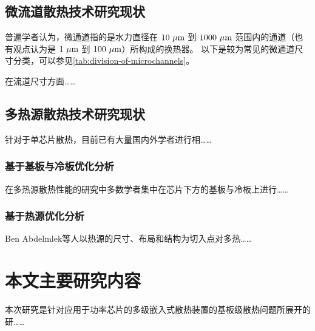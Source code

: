 \subsection{微流道散热技术研究现状}
普遍学者认为，微通道指的是水力直径在 $10\ \rm{\mu m}$ 到 $1000\ \rm{\mu m}$ 范围内的通道（也有观点认为是 $1\ \rm{\mu m}$ 到 $100\ \rm{\mu m}$）所构成的换热器。
以下是较为常见的微通道尺寸分类，可以参见\cref{tab:division-of-microchannels}。
\begin{table}[htbp]
    \caption[微通道的划分]{微通道的划分\cite{LuSiHong_2021}}
    \label{tab:division-of-microchannels}
\end{table}

在流道尺寸方面……

\subsection{多热源散热技术研究现状}
针对于单芯片散热，目前已有大量国内外学者进行相……

\subsubsection{基于基板与冷板优化分析}
在多热源散热性能的研究中多数学者集中在芯片下方的基板与冷板上进行……

\subsubsection{基于热源优化分析}
Ben Abdelmlek等人以热源的尺寸、布局和结构为切入点对多热……

\section{本文主要研究内容}
本次研究是针对应用于功率芯片的多级嵌入式散热装置的基板级散热问题所展开的研……

